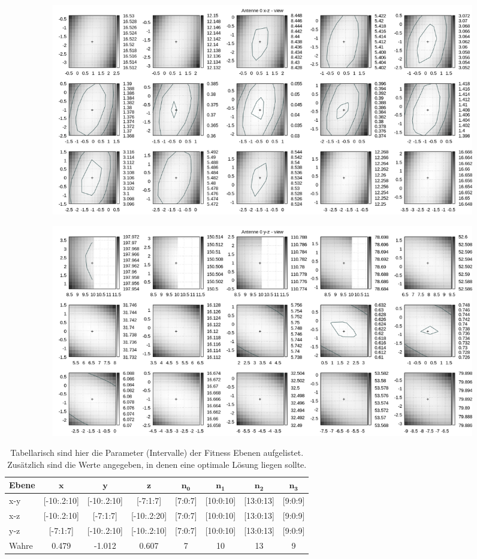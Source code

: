 \begin{figure}[!h]
\begin{subfigure}[t]{0.4\textwidth}
			\centering
			\includegraphics[width=\textwidth]{img/fitness/xz_a0zoomed.png}
	 \end{subfigure}
	 \qquad
     \begin{subfigure}[t]{0.4\textwidth}
			\centering
			\includegraphics[width=\textwidth]{img/fitness/yz_a0zoomed.png}
	 \end{subfigure}      
\end{figure}
%
\begin{table} [h]
	\begin{center}
		\caption[Parameter der Fitness Ebenen]{Tabellarisch sind hier die Parameter (Intervalle) der Fitness Ebenen aufgelistet. Zusätzlich sind die Werte angegeben, in denen eine optimale Lösung liegen sollte. }
		\label{tab:complexity1}
		\begin{tabular}{lccccccc}
		\textbf{Ebene} & $\mathbf{x}$ & $\mathbf{y}$ & $\mathbf{z}$ & $\mathbf{n_0}$ & $\mathbf{n_1}$& $\mathbf{n_2}$ & $\mathbf{n_3}$ \\
			\hline
			x-y & [-10:.2:10]		& [-10:.2:10]	& [-7:1:7] & [7:0:7] & [10:0:10]& [13:0:13]&[9:0:9]   \\
			x-z & [-10:.2:10] 	& [-7:1:7] 	& [-10:.2:20] & [7:0:7] & [10:0:10]& [13:0:13]&[9:0:9] \\
			y-z & [-7:1:7]  	& [-10:.2:10]	& [-10:.2:10] & [7:0:7] & [10:0:10]& [13:0:13]&[9:0:9]\\
			\hline
			Wahre & 0.479 & -1.012 & 0.607 & 7  & 10 & 13 & 9			\\
%
		\end{tabular}
	\end{center}
\end{table}